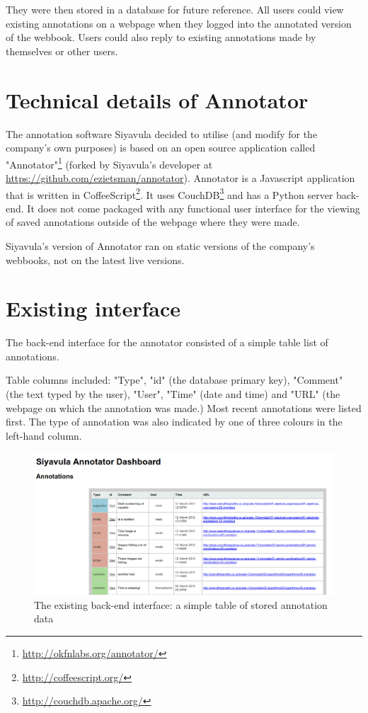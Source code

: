 They were then stored in a database for future reference. All users could view existing annotations on a webpage when they logged into the annotated version of the webbook. Users could also reply to existing annotations made by themselves or other users.

\section{Technical details of Annotator}
The annotation software Siyavula decided to utilise (and modify for the company's own purposes) is based on an open source application called "Annotator"\footnote{\href{ http://okfnlabs.org/annotator/}{ http://okfnlabs.org/annotator/}} (forked by Siyavula's developer at \href{https://github.com/ezietsman/annotator}{https://github.com/ezietsman/annotator}). Annotator is a Javascript application that is written in CoffeeScript\footnote{\href{http://coffeescript.org/}{http://coffeescript.org/}}. It uses CouchDB\footnote{\href{http://couchdb.apache.org/}{http://couchdb.apache.org/}} and has a Python server back-end. It does not come packaged with any functional user interface for the viewing of saved annotations outside of the webpage where they were made.

Siyavula's version of Annotator ran on static versions of the company's webbooks, not on the latest live versions.

\section{Existing interface}
The back-end interface for the annotator consisted of a simple table list of annotations.

Table columns included: "Type", "id" (the database primary key), "Comment" (the text typed by the user), "User", "Time" (date and time) and "URL" (the webpage on which the annotation was made.) Most recent annotations were listed first. The type of annotation was also indicated by one of three colours in the left-hand column.
\begin{figure}[h]
    \centering
    \includegraphics[width=\textwidth]{Figures/annotator-backend-table.png}
 \caption{The existing back-end interface: a simple table of stored annotation data}
\end{figure}


